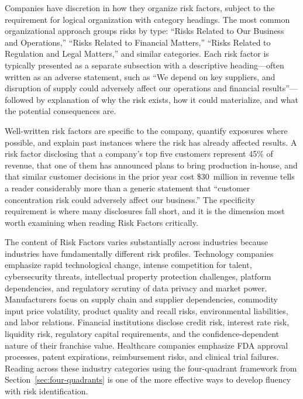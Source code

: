\documentclass[11pt,openany]{book}
\begin{document}
Companies have discretion in how they organize risk factors, subject to the requirement for logical organization with category headings. The most common organizational approach groups risks by type: ``Risks Related to Our Business and Operations,'' ``Risks Related to Financial Matters,'' ``Risks Related to Regulation and Legal Matters,'' and similar categories. Each risk factor is typically presented as a separate subsection with a descriptive heading---often written as an adverse statement, such as ``We depend on key suppliers, and disruption of supply could adversely affect our operations and financial results''---followed by explanation of why the risk exists, how it could materialize, and what the potential consequences are.

Well-written risk factors are specific to the company, quantify exposures where possible, and explain past instances where the risk has already affected results. A risk factor disclosing that a company's top five customers represent 45\% of revenue, that one of them has announced plans to bring production in-house, and that similar customer decisions in the prior year cost \$30~million in revenue tells a reader considerably more than a generic statement that ``customer concentration risk could adversely affect our business.'' The specificity requirement is where many disclosures fall short, and it is the dimension most worth examining when reading Risk Factors critically.

The content of Risk Factors varies substantially across industries because industries have fundamentally different risk profiles. Technology companies emphasize rapid technological change, intense competition for talent, cybersecurity threats, intellectual property protection challenges, platform dependencies, and regulatory scrutiny of data privacy and market power. Manufacturers focus on supply chain and supplier dependencies, commodity input price volatility, product quality and recall risks, environmental liabilities, and labor relations. Financial institutions disclose credit risk, interest rate risk, liquidity risk, regulatory capital requirements, and the confidence-dependent nature of their franchise value. Healthcare companies emphasize FDA approval processes, patent expirations, reimbursement risks, and clinical trial failures. Reading across these industry categories using the four-quadrant framework from Section~\ref{sec:four-quadrants} is one of the more effective ways to develop fluency with risk identification.
\end{document}
